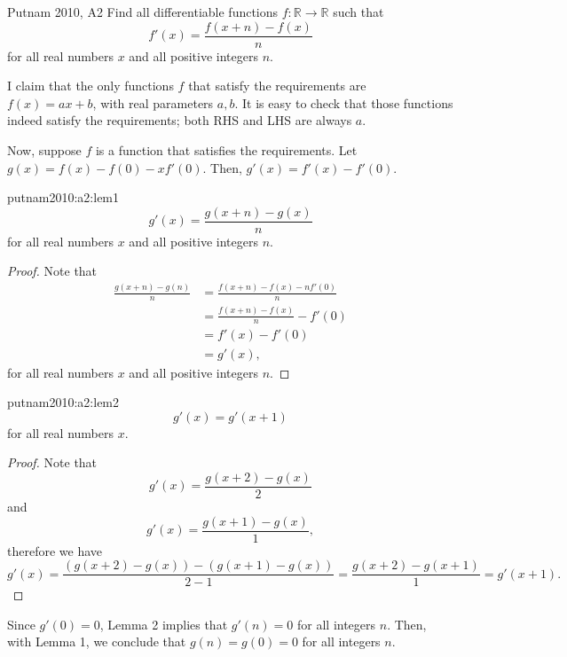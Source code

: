 
\begin{prob}{Putnam 2010, A2}{}
	Find all differentiable functions $f:\mathbb{R}\to\mathbb{R}$ such that
	\[f'(x)=\frac{f(x+n)-f(x)}n\]
	for all real numbers $x$ and all positive integers $n.$
\end{prob}
\begin{sol}{}{}
	I claim that the only functions \(f\) that satisfy the requirements are \(f(x) = ax + b\), with real parameters \(a, b\).
	It is easy to check that those functions indeed satisfy the requirements; both RHS and LHS are always \(a\).

	Now, suppose \(f\) is a function that satisfies the requirements.
	Let \(g(x) = f(x) - f(0) - xf'(0)\). Then, \(g'(x) = f'(x) - f'(0)\).

	\begin{lem}{}{putnam2010:a2:lem1}
	\[g'(x)=\frac{g(x+n)-g(x)}n\]
	for all real numbers $x$ and all positive integers $n.$
	\end{lem}
	\begin{proof}
	Note that
	\begin{align*}
		\frac{g(x + n) - g(n)}{n} &= \frac{f(x + n) - f(x) - nf'(0)}{n} \\
								  &= \frac{f(x + n) - f(x)}{n} - f'(0) \\
								  &= f'(x) - f'(0) \\
								  &= g'(x),
	\end{align*}
	for all real numbers \(x\) and all positive integers \(n\).
	\end{proof}

	\begin{lem}{}{putnam2010:a2:lem2}
		\[
			g'(x) = g'(x+1)
		\]
		for all real numbers \(x\).
	\end{lem}
	\begin{proof}
		Note that \[
			g'(x) = \frac{g(x+2) - g(x)}{2}
		\]
		and \[
			g'(x) = \frac{g(x+1) - g(x)}{1},
		\]
		therefore we have \[
			g'(x) = \frac{(g(x + 2) - g(x)) - (g(x+1) - g(x))}{2 - 1} = \frac{g(x+2) - g(x+1)}{1} = g'(x+1).
		\]
	\end{proof}

	Since \(g'(0) = 0\), Lemma 2 implies that \(g'(n) = 0\) for all integers \(n\). Then, with Lemma 1, we conclude that \(g(n) = g(0) = 0\) for all integers \(n\).


\end{sol}
